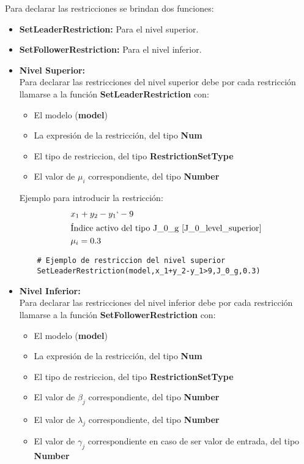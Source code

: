 Para declarar las restricciones se brindan dos funciones:
\begin{itemize}
    \item \textbf{SetLeaderRestriction:} Para el nivel superior.
    \item \textbf{SetFollowerRestriction:} Para el nivel inferior.
\end{itemize}
\begin{itemize}
    \item \textbf{Nivel Superior:}\\

Para declarar las restricciones del nivel superior debe por cada restricción
llamarse a la función \textbf{SetLeaderRestriction} con:
\begin{itemize}
    \item El modelo (\textbf{model})
    \item La expresión de la restricción, del tipo \textbf{Num}
    \item El tipo de restriccion, del tipo \textbf{RestrictionSetType}
    \item El valor de $\mu_i$ correspondiente, del tipo \textbf{Number} 
\end{itemize}

Ejemplo para introducir la restricción:
\begin{align*}
    &x_1+y_2-y_1 \lq -9 \\
    &\text{Índice activo del tipo J\_0\_g \refeq{J_0_level_superior}}\\
    & \mu_i=0.3
\end{align*}

\begin{lstlisting}
    # Ejemplo de restriccion del nivel superior
    SetLeaderRestriction(model,x_1+y_2-y_1>9,J_0_g,0.3)
\end{lstlisting}

\item \textbf{Nivel Inferior:}\\
 Para declarar las restricciones del nivel inferior debe por cada restricción
llamarse a la función \textbf{SetFollowerRestriction} con:
\begin{itemize}
    \item El modelo (\textbf{model})
    \item La expresión de la restricción, del tipo \textbf{Num}
    \item El tipo de restriccion, del tipo \textbf{RestrictionSetType}
    \item El valor de $\beta_j$ correspondiente, del tipo \textbf{Number}
    \item El valor de $\lambda_j$ correspondiente, del tipo \textbf{Number}
    \item El valor de $\gamma_j$ correspondiente en caso de ser valor de entrada, del tipo \textbf{Number}
\end{itemize}


\end{itemize}
